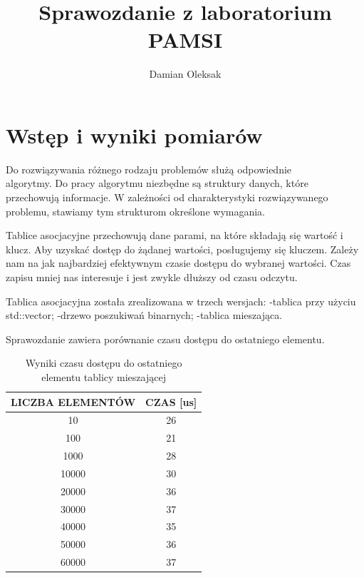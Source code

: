 \documentclass[12pt,a4paper]{article}
\title{Sprawozdanie z laboratorium PAMSI}
\author{Damian Oleksak}
\date{}
\begin{document}
\maketitle
\newpage

\section*{Wstęp i wyniki pomiarów}

Do rozwiązywania różnego rodzaju problemów służą odpowiednie\\ algorytmy. Do pracy algorytmu niezbędne są struktury danych, które przechowują informacje.
W zależności od charakterystyki rozwiązywanego problemu, stawiamy tym strukturom określone wymagania.
\newline

Tablice asocjacyjne przechowują dane parami, na które składają się wartość i klucz. Aby uzyskać dostęp do żądanej wartości, posługujemy się kluczem. Zależy nam na jak najbardziej efektywnym czasie dostępu do wybranej wartości. Czas zapisu mniej nas interesuje i jest zwykle dłuższy od czasu odczytu.
\newline

Tablica asocjacyjna została zrealizowana w trzech wersjach:\newline
-tablica przy użyciu std::vector;\newline
-drzewo poszukiwań binarnych;\newline
-tablica mieszająca.\newline

Sprawozdanie zawiera porównanie czasu dostępu do ostatniego elementu.
\newpage


\begin{table}[t]
\caption{Wyniki czasu dostępu do ostatniego elementu tablicy mieszającej}
\label{tab. mieszająca}
\centering
\begin{tabular}{|c|c|}
  \hline 
  LICZBA ELEMENTÓW & CZAS [us]\\
  \hline
  10 & 26 \\
  \hline
  100 & 21 \\
  \hline
    1000 & 28 \\
    \hline
      10000 & 30 \\
      \hline
        20000 & 36 \\
        \hline
          30000 & 37 \\
          \hline
            40000 & 35 \\
            \hline
              50000 & 36 \\
              \hline
                60000 & 37 \\
  \hline
\end{tabular} 
\end{table}
\end{document}
